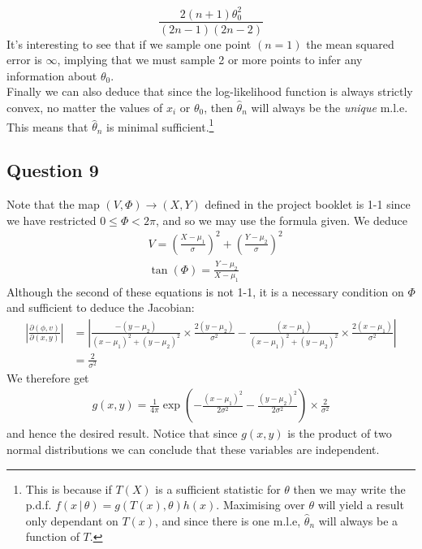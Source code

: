 \documentclass[10pt,a4paper,notitlepage]{article}
\begin{document}
\begin{equation} 
\frac{2\left(n+1\right)\theta_{0}^{2}}{\left(2n-1\right)\left(2n-2\right)}
\end{equation}
It's interesting to see that if we sample one point $(n=1)$ the mean squared error is $\infty$, implying that we must sample 2 or more points to infer any information about $\theta_{0}$.\\
Finally we can also deduce that since the log-likelihood function is always strictly convex, no matter the values of $x_{i}$ or $\theta_{0}$, then $\widehat{\theta}_{n}$ will always be the \textit{unique} m.l.e. This means that $\widehat{\theta}_{n}$ is minimal sufficient.\footnote{This is because if $T(X)$ is a sufficient statistic for $\theta$ then we may write the p.d.f. $f(x \, |\, \theta) = g\left(T(x),\theta\right)h\left(x\right)$.  Maximising over $\theta$ will yield a result only dependant on $T\left(x\right)$, and since there is one m.l.e, $\widehat{\theta}_{n}$ will always be a function of $T$. }

\subsection*{\centering Question 9}
Note that the map $(V,\Phi)\rightarrow (X,Y)$ defined in the project booklet is 1-1 since we have restricted $0\leq \Phi< 2\pi$, and so we may use the formula given. We deduce
\begin{equation}
\begin{aligned}
&V =\left(\frac{X-\mu_{1}}{\sigma}\right)^{2}+\left(\frac{Y-\mu_{2}}{\sigma}\right)^{2}\\
&\tan\left(\Phi\right) = \frac{Y-\mu_{2}}{X-\mu_{1}}
\end{aligned}
\end{equation}
Although the second of these equations is not 1-1, it is a necessary condition on $\Phi$ and sufficient to deduce the Jacobian: 
\begin{equation}
\begin{aligned}
\left|\frac{\partial \left( \phi,v\right)}{\partial\left(x,y\right)}\right| &= \left|\frac{-\left(y-\mu_{2}\right)}{\left(x-\mu_{1}\right)^{2}+\left(y-\mu_{2}\right)^{2}}\times\frac{2\left(y-\mu_{2}\right)}{\sigma^{2}}-\frac{\left(x-\mu_{1}\right)}{\left(x-\mu_{1}\right)^{2}+\left(y-\mu_{2}\right)^{2}}\times\frac{2\left(x-\mu_{1}\right)}{\sigma^{2}}\right|\\
&= \frac{2}{\sigma^{2}}
\end{aligned}
\end{equation}
We therefore get
\begin{equation}
\begin{aligned}
g\left(x,y\right)=\frac{1}{4\pi}\exp\left(-\frac{(x-\mu_{1})^{2}}{2\sigma^2}-\frac{(y-\mu_{2})^{2}}{2\sigma^{2}}\right)\times \frac{2}{\sigma^{2}}
\end{aligned}
\end{equation}
and hence the desired result. Notice that since $g(x,y)$ is the product of two normal distributions we can conclude that these variables are independent.
\end{document}
